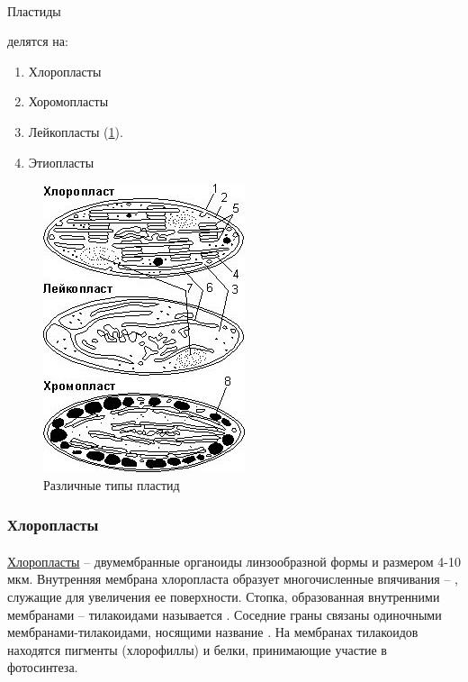 \paragraph*{}\hypertarget{cell_plastids}{Пластиды} делятся на: 

\begin{enumerate}

	\item Хлоропласты 
	\item Хоромопласты 
	\item Лейкопласты (\ris \ref{plastids}). 
	\item Этиопласты

\end{enumerate}



\begin{figure}
  \centering
       \includegraphics[width=0.3\linewidth]{pictures/plastids}
\caption{Различные типы пластид}
\label{plastids}
\end{figure}

\subsubsection*{Хлоропласты}

\paragraph*{}\hyperlink{question_hloroplast}{Хлоропласты} -- двумембранные органоиды линзообразной формы и размером 4-10 мкм. Внутренняя мембрана хлоропласта образует многочисленные впячивания -- , служащие для увеличения ее поверхности. Стопка, образованная внутренними мембранами -- тилакоидами называется . Соседние граны связаны одиночными мембранами-тилакоидами, носящими название . На мембранах тилакоидов находятся пигменты (хлорофиллы) и белки, принимающие участие в фотосинтеза.

